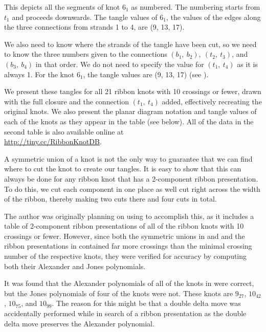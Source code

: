 \begin{paper}
{This depicts all the segments of knot $6_1$ as numbered.
The numbering starts from $t_1$ and proceeds downwards.
The tangle values of $6_1$, the values of the edges along the three connections
from strands 1 to 4, are (9, 13, 17).}

We also need to know where the strands of the tangle have been cut, so we need
to know the three numbers given to the connections $(b_1,~b_2),~(t_2,~t_3)$, and
$(b_3,~b_4)$ in that order.
We do not need to specify the value for $(t_1,~t_4)$ as it is always 1.
For the knot $6_1$, the tangle values are (9, 13, 17) (see \figExample).

We present these tangles for all 21 ribbon knots with 10 crossings or fewer,
drawn with the full closure and the connection $(t_1,~t_4)$ added, effectively
recreating the original knots.
We also present the planar diagram notation and tangle values of each of the
knots as they appear in the table (see below).
All of the data in the second table is also available online at\\
\url{http://tiny.cc/RibbonKnotDB}.


A symmetric union of a knot is not the only way to guarantee that we can find
where to cut the knot to create our tangles.
It is easy to show that this can always be done for any ribbon knot that has a
2-component ribbon presentation.
To do this, we cut each component in one place as well cut right across the
width of the ribbon, thereby making two cuts there and four cuts in total.

The author was originally planning on using \cite{knots} to accomplish this, as
it includes a table of 2-component ribbon presentations of all of the ribbon
knots with 10 crossings or fewer.
However, since both the symmetric unions in \cite{one} and \cite{many} and the
ribbon presentations in \cite{knots} contained far more crossings than the
minimal crossing number of the respective knots, they were verified for accuracy
by computing both their Alexander and Jones polynomials.

It was found that the Alexander polynomials of all of the knots in \cite{knots}
were correct, but the Jones polynomials of four of the knots were not.
These knots are $9_{27}$, $10_{42}$, $10_{75}$, and $10_{99}$.
The reason for this might be that a double delta move was accidentally performed
while in search of a ribbon presentation as the double delta move preserves the
Alexander polynomial.


\end{paper}
